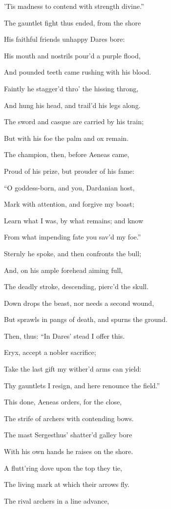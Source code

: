 ’Tis madness to contend with strength divine.”

The gauntlet fight thus ended, from the shore

His faithful friends unhappy Dares bore:

His mouth and nostrils pour’d a purple flood,

And pounded teeth came rushing with his blood.

Faintly he stagger’d thro’ the hissing throng,

And hung his head, and trail’d his legs along.

The sword and casque are carried by his train;

But with his foe the palm and ox remain.

The champion, then, before Aeneas came,

Proud of his prize, but prouder of his fame:

“O goddess-born, and you, Dardanian host,

Mark with attention, and forgive my boast;

Learn what I was, by what remains; and know

From what impending fate you sav’d my foe.”

Sternly he spoke, and then confronts the bull;

And, on his ample forehead aiming full,

The deadly stroke, descending, pierc’d the skull.

Down drops the beast, nor needs a second wound,

But sprawls in pangs of death, and spurns the ground.

Then, thus: “In Dares’ stead I offer this.

Eryx, accept a nobler sacrifice;

Take the last gift my wither’d arms can yield:

Thy gauntlets I resign, and here renounce the field.”

This done, Aeneas orders, for the close,

The strife of archers with contending bows.

The mast Sergesthus’ shatter’d galley bore

With his own hands he raises on the shore.

A flutt’ring dove upon the top they tie,

The living mark at which their arrows fly.

The rival archers in a line advance,

